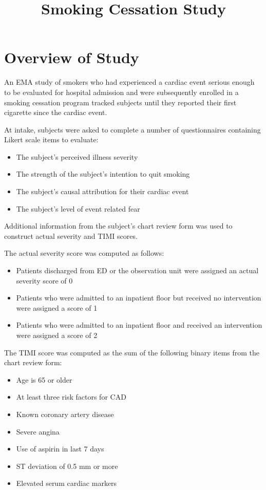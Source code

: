 \documentclass[12pt]{article}
\begin{document}
%
\title{Smoking Cessation Study}
\maketitle
\section*{Overview of Study}
An EMA study of smokers who had experienced a cardiac event serious enough to be evaluated for hospital admission and were subsequently enrolled in a smoking cessation program tracked subjects until they reported their first cigarette since the cardiac event. 
\par\vspace{0.3 cm}
At intake, subjects were asked to complete a number of questionnaires containing Likert scale items to evaluate:
\par\vspace{0.3 cm}
\begin{itemize}
\item The subject's perceived illness severity
\item The strength of the subject's intention to quit smoking
\item The subject's causal attribution for their cardiac event
\item The subject's level of event related fear
\end{itemize}
\par\vspace{0.3 cm}
Additional information from the subject's chart review form was used to construct actual severity and TIMI scores. 
\par\vspace{0.3 cm}
The actual severity score was computed as follows:
\begin{itemize}
\item Patients discharged from ED or the observation unit were assigned an actual severity score of 0
\item Patients who were admitted to an inpatient floor but received no intervention were assigned a score of 1
\item Patients who were admitted to an inpatient floor and received an intervention were assigned a score of 2
\end{itemize}
\par\vspace{0.3 cm}
The TIMI score was computed as the sum of the following binary items from the chart review form:
\begin{itemize}
\item Age is 65 or older
\item At least three risk factors for CAD
\item Known coronary artery disease
\item Severe angina
\item Use of aspirin in last 7 days
\item ST deviation of 0.5 mm or more
\item Elevated serum cardiac markers
\end{itemize}
\end{document}
